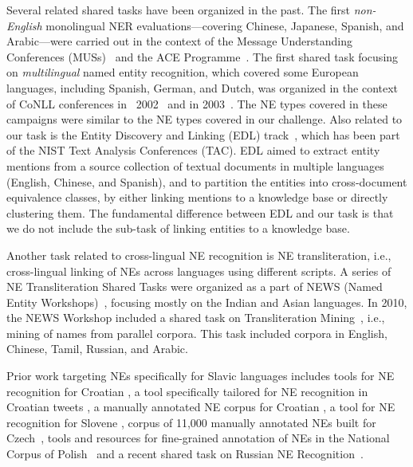 \documentclass[11pt]{article}
\begin{document}
Several related shared tasks have been organized in the past.  The first
{\em non-English} monolingual NER evaluations---covering Chinese,
Japanese, Spanish, and Arabic---were carried out in the context of the
Message Understanding Conferences (MUSs)~\cite{chinchor:98} and the ACE
Programme~\cite{conf/lrec/DoddingtonMPRSW04}.  The first shared task
focusing on \emph{multilingual} named entity recognition, which covered
some European languages, including Spanish, German, and Dutch, was
organized in the context of CoNLL conferences in
~2002~\cite{TjongKimSang:2002:ICS:1118853.1118877} and in
2003~\cite{TjongKimSang:2003:ICS:1119176.1119195}.  The NE types covered
in these campaigns were similar to the NE types covered in our challenge.
Also related to our task is the Entity Discovery and Linking (EDL)
track~\cite{ji:ea:2014,ji:ea:2015}, which has been part of the NIST Text
Analysis Conferences (TAC).  EDL aimed to extract entity mentions from a
source collection of textual documents in multiple languages (English,
Chinese, and Spanish), and to partition the entities into cross-document
equivalence classes, by either linking mentions to a knowledge base or
directly clustering them.  The fundamental difference between EDL and our
task is that we do not include the sub-task of linking entities to a
knowledge base.

Another task related to cross-lingual NE recognition is NE
transliteration, i.e., cross-lingual linking of NEs across languages
using different scripts.  A series of NE Transliteration Shared Tasks
were organized as a part of NEWS (Named Entity
Workshops)~\cite{duan2016report}, focusing mostly on the Indian and Asian
languages.  In 2010, the NEWS Workshop included a shared task on
Transliteration Mining~\cite{kumaran2010report}, i.e., mining of names
from parallel corpora.  This task included corpora in English, Chinese,
Tamil, Russian, and Arabic.

Prior work targeting NEs
specifically for Slavic languages includes tools for NE recognition for
Croatian \cite{karan2013croner,ljubesic2013combining}, a tool specifically tailored for NE
recognition in Croatian tweets \cite{baksa2017tagging}, a manually annotated NE
corpus for Croatian \cite{agic2014setimes}, a tool for NE recognition for
Slovene \cite{ljubesic2013combining}, corpus of 11,000 manually annotated NEs
built for Czech~\cite{vsevvcikova2007named}, tools and resources for
fine-grained annotation of NEs in the National Corpus of
Polish~\cite{was:etal:10,sav:pis:11} and a recent shared task on Russian NE
Recognition~\cite{alexeeva2016factrueval}.
\end{document}
